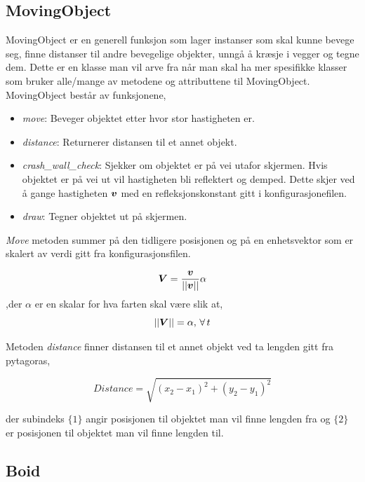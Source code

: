 {\subsection{MovingObject}

MovingObject er en generell funksjon som lager instanser som skal kunne bevege seg, finne distanser til andre bevegelige objekter, unngå å kræsje i vegger og tegne dem.
Dette er en klasse man vil arve fra når man skal ha mer spesifikke klasser som bruker alle/mange av metodene og attributtene til MovingObject.
MovingObject består av funksjonene,

\begin{itemize}
    \item \emph{move}: Beveger objektet etter hvor stor hastigheten er.
    \item \emph{distance}: Returnerer distansen til et annet objekt.
    \item \emph{crash\_wall\_check}: Sjekker om objektet er på vei utafor skjermen. Hvis objektet er på vei ut vil hastigheten bli reflektert og demped. Dette skjer ved å gange hastigheten $\boldsymbol{v}$ med en refleksjonskonstant gitt i konfigurasjonefilen.
    \item \emph{draw}: Tegner objektet ut på skjermen.
\end{itemize}

\emph{Move} metoden summer på den tidligere posisjonen og på en enhetsvektor som er skalert av verdi gitt fra konfigurasjonsfilen.

\begin{equation}
    \boldsymbol{V} = \frac{\boldsymbol{v}}{||\boldsymbol{v}||}\alpha
\end{equation}
,der $\alpha$ er en skalar for hva farten skal være slik at,
\begin{equation}
     ||\boldsymbol{V}|| = \alpha, \, \forall\,t
\end{equation}

Metoden \emph{distance} finner distansen til et annet objekt ved ta lengden gitt fra pytagoras,

\begin{equation*}
    Distance = \sqrt{(x_{2} - x_{1})^2 + (y_{2} - y_{1})^2}
\end{equation*}

der subindeks $\{1\}$ angir posisjonen til objektet man vil finne lengden fra og $\{2\}$ er posisjonen til objektet man vil finne lengden til.

\subsection{Boid}

}
